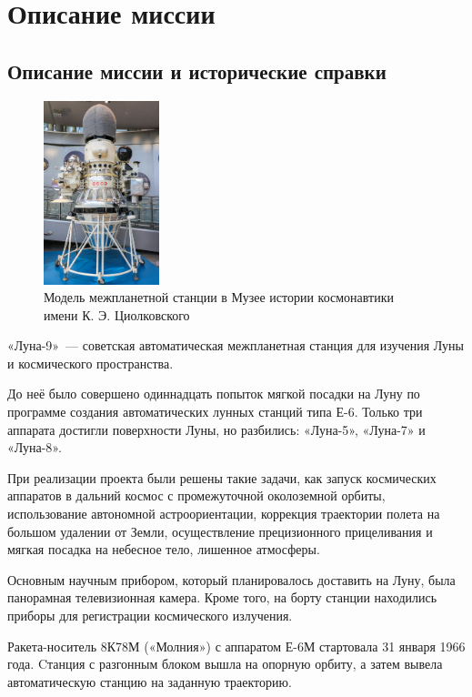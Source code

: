 \section{Описание миссии}
\subsection{Описание миссии и исторические справки}
\begin{figure} %
	\centering
	\includegraphics[width=0.3\textwidth]{Luna_9_Space_Probe}
	\caption{Модель межпланетной станции в Музее истории космонавтики имени К. Э. Циолковского}
\end{figure}

\noindent «Луна-9» — советская автоматическая межпланетная станция для изучения Луны и космического пространства. 

\noindent До неё было совершено одиннадцать попыток мягкой посадки на Луну по программе создания автоматических лунных станций типа Е-6. Только три аппарата достигли поверхности Луны, но разбились: «Луна-5», «Луна-7» и «Луна-8».

\noindent При реализации проекта были решены такие задачи, как запуск космических аппаратов в дальний космос с промежуточной околоземной орбиты, использование автономной астроориентации, коррекция траектории полета на большом удалении от Земли, осуществление прецизионного прицеливания и мягкая посадка на небесное тело, лишенное атмосферы.

\noindent Основным научным прибором, который планировалось доставить на Луну, была панорамная телевизионная камера. Кроме того, на борту станции находились приборы для регистрации космического излучения.

\noindent Ракета-носитель 8К78М («Молния») с аппаратом Е-6М стартовала 31 января 1966 года. Cтанция с разгонным блоком вышла на опорную орбиту, а затем вывела автоматическую станцию на заданную траекторию.


